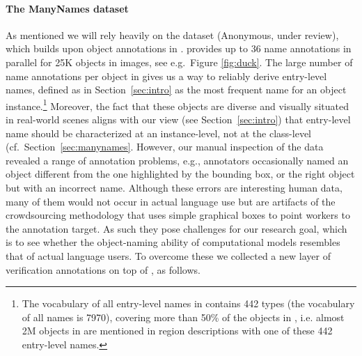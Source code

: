 \paragraph{The ManyNames dataset}
As mentioned we will rely heavily on the \mn dataset (Anonymous, under review), which builds upon object annotations in \vg.
\mn provides up to 36 name annotations in parallel for 25K objects in images, see e.g.\ Figure \ref{fig:duck}.
The large number of name annotations per object in \mn gives us a way to reliably derive entry-level names, defined as in Section~\ref{sec:intro} as the most frequent name for an object instance.\footnote{
	The vocabulary of all entry-level names in \mn contains 442 types (the vocabulary of all names is 7970), covering more than 50\% of the objects in \vg, i.e. almost 2M objects in \vg are mentioned in region descriptions with one of these 442 entry-level names.
}
Moreover, the fact that these objects are diverse and visually situated in real-world scenes aligns with our view (see Section~\ref{sec:intro}) that entry-level name should be characterized at an instance-level, not at the class-level (cf.\ Section~\ref{sec:manynames}.
However, our manual inspection of the \mn data revealed a range of annotation problems, e.g., annotators occasionally named an object different from the one highlighted by the bounding box, or the right object but with an incorrect name.
Although these errors are interesting human data, many of them would not occur in actual language use but are artifacts of the crowdsourcing methodology that uses simple graphical boxes to point workers to the annotation target.
As such they pose challenges for our research goal, which is to see whether the object-naming ability of computational models resembles that of actual language users.
To overcome these we collected a new layer of verification annotations on top of \mn, as follows.

